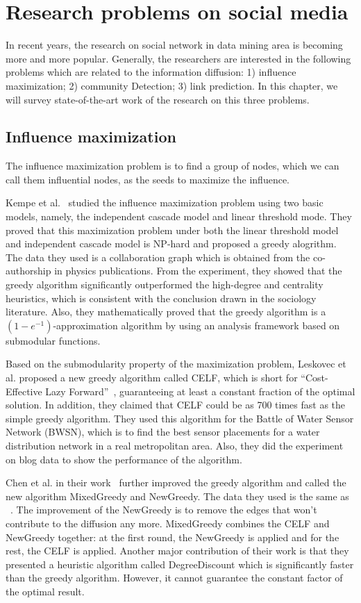 \chapter{Research problems on social media}
\label{chap:direction}
In recent years, the research on social network in data mining area
is becoming more and more popular. Generally, the researchers are
interested in the following problems which are related to the
information diffusion: 1) influence maximization;
2) community Detection; 3) link prediction. In this chapter, we will
survey state-of-the-art work of the research on this three problems.

\section{Influence maximization}

The influence maximization problem is to find a group of nodes, which
we can call them influential nodes, as the seeds to maximize the
influence. 

Kempe et al.~\cite{kempe2003maximizing} studied the influence
maximization problem using two basic models, namely, the
independent cascade model and linear threshold mode. They proved that
this maximization problem under both the linear threshold model and
independent cascade model is NP-hard and proposed a greedy
alogrithm. The data they used is a collaboration graph which is
obtained from the co-authorship in physics publications. From the
experiment, they showed that the greedy algorithm significantly
outperformed the high-degree and centrality heuristics, which is
consistent with the conclusion drawn in the sociology literature. Also,
they mathematically proved that the greedy algorithm is a
$(1-e^{-1})$-approximation algorithm by using an analysis framework
based on submodular functions.

Based on the submodularity property of the maximization problem,
Leskovec et al. proposed a new greedy
algorithm called CELF, which is short for ``Cost-Effective Lazy Forward''~\cite{leskovec2007cost},
guaranteeing at least a constant fraction of the optimal
solution. In addition, they claimed that CELF could be as 700 times
fast as the simple greedy algorithm. They used this algorithm for the Battle of Water Sensor Network (BWSN), which is to
find the best sensor placements for a water distribution network in a real metropolitan area. Also, they did the experiment on blog data
to show the performance of the algorithm.

Chen et al. in their work~\cite{chen2009efficient} further improved
the greedy algorithm and called the new algorithm MixedGreedy and NewGreedy. The data they
used is the same as ~\cite{kempe2003maximizing}. The improvement
of the NewGreedy is to remove the edges that won't contribute to the
diffusion any more. MixedGreedy combines the CELF and NewGreedy
together: at the first round, the NewGreedy is applied and for the
rest, the CELF is applied. Another major contribution of their work is
that they presented a heuristic algorithm called DegreeDiscount which is
significantly faster than the greedy algorithm. However, it cannot
guarantee the constant factor of the optimal result.

